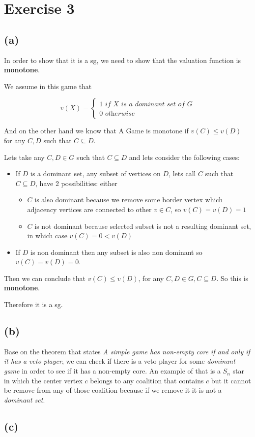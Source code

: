 \documentclass[12pt, a4paper]{article}
\begin{document}
\section{Exercise 3}
\subsection{(a)}
In order to show that it is a \acrfull{sg}, we need to show that the valuation function is \textbf{monotone}.

We assume in this game that

\[ v(X) = \begin{cases}
  1 \textit{ if X is a dominant set of G}\\
  0 \textit{ otherwise}
\end{cases}
\]

And on the other hand we know that A Game is monotone if $v(C) \leq v(D)$ for any $C, D$ such that $C \subseteq D$.

Lets take any $C,D \in G$ such that $C \subseteq D$ and lets consider the following cases:

\begin{itemize}
  \item If $D$ is a dominant set, any subset of vertices on $D$, lets call $C$ such that $C \subseteq D$, have 2 possibilities: either
  \begin{itemize}
    \item $C$ is also dominant because we remove some border vertex which adjacency vertices are connected to other $v \in C$, so $v(C) = v(D) = 1$
    \item $C$ is not dominant because selected subset is not a resulting dominant set, in which case $v(C) = 0 < v(D)$
  \end{itemize}
  \item If $D$ is non dominant then any subset is also non dominant so $v(C) = v(D) = 0$.
\end{itemize}

Then we can conclude that $v(C) \leq v(D)$, for any $C, D \in G, C \subseteq D$. So this is \textbf{monotone}.

Therefore it is a \acrshort{sg}.

\subsection{(b)}
Base on the theorem that states \textit{A simple game has non-empty core if and only if it has a veto player}, we can check
if there is a veto player for some \textit{dominant game} in order to see if it has a non-empty core.
An example of that is a $S_n$ star in which the center vertex $c$ belongs to any coalition that contains $c$ but it cannot be remove from any of those 
coalition because if we remove it it is not a \textit{dominant set}.

\subsection{(c)}
\end{document}
